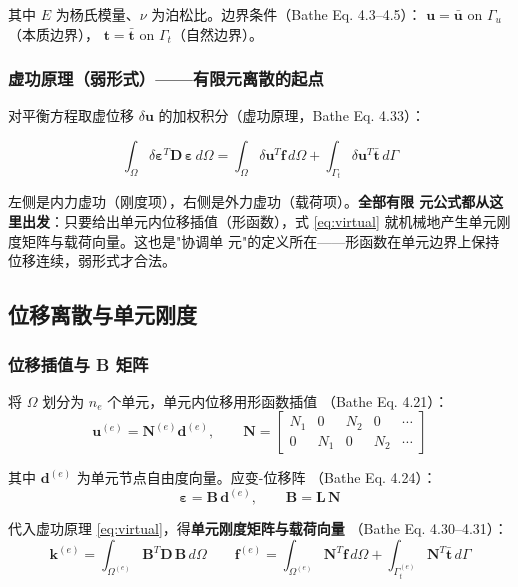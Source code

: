 \documentclass[12pt,a4paper]{ctexart}
\begin{document}
其中 $E$ 为杨氏模量、$\nu$ 为泊松比。边界条件（Bathe Eq. 4.3--4.5）：
$\mathbf{u} = \bar{\mathbf{u}}$ on $\Gamma_u$（本质边界），
$\mathbf{t} = \bar{\mathbf{t}}$ on $\Gamma_t$（自然边界）。

\subsubsection{虚功原理（弱形式）——有限元离散的起点}

对平衡方程取虚位移 $\delta\mathbf{u}$ 的加权积分（虚功原理，Bathe
Eq. 4.33）：

\begin{equation}
\int_\Omega \delta\boldsymbol{\varepsilon}^T \mathbf{D}\,\boldsymbol{\varepsilon}\,d\Omega
= \int_\Omega \delta\mathbf{u}^T \mathbf{f}\,d\Omega
+ \int_{\Gamma_t} \delta\mathbf{u}^T \bar{\mathbf{t}}\,d\Gamma
\label{eq:virtual}
\end{equation}

左侧是内力虚功（刚度项），右侧是外力虚功（载荷项）。\textbf{全部有限
元公式都从这里出发}：只要给出单元内位移插值（形函数），式
\eqref{eq:virtual} 就机械地产生单元刚度矩阵与载荷向量。这也是"协调单
元"的定义所在——形函数在单元边界上保持位移连续，弱形式才合法。

\subsection{位移离散与单元刚度}

\subsubsection{位移插值与 B 矩阵}

将 $\Omega$ 划分为 $n_e$ 个单元，单元内位移用形函数插值
（Bathe Eq. 4.21）：
\begin{equation}
\mathbf{u}^{(e)} = \mathbf{N}^{(e)} \mathbf{d}^{(e)},
\qquad
\mathbf{N} = \begin{bmatrix} N_1 & 0 & N_2 & 0 & \cdots \\ 0 & N_1 & 0 & N_2 & \cdots \end{bmatrix}
\end{equation}

其中 $\mathbf{d}^{(e)}$ 为单元节点自由度向量。应变-位移阵
（Bathe Eq. 4.24）：
\begin{equation}
\boldsymbol{\varepsilon} = \mathbf{B}\,\mathbf{d}^{(e)},
\qquad
\mathbf{B} = \mathbf{L}\,\mathbf{N}
\end{equation}

代入虚功原理 \eqref{eq:virtual}，得\textbf{单元刚度矩阵与载荷向量}
（Bathe Eq. 4.30--4.31）：
\begin{equation}
\mathbf{k}^{(e)} = \int_{\Omega^{(e)}} \mathbf{B}^T \mathbf{D}\,\mathbf{B}\,d\Omega
\qquad
\mathbf{f}^{(e)} = \int_{\Omega^{(e)}} \mathbf{N}^T \mathbf{f}\,d\Omega
+ \int_{\Gamma_t^{(e)}} \mathbf{N}^T \bar{\mathbf{t}}\,d\Gamma
\label{eq:ke}
\end{equation}
\end{document}
